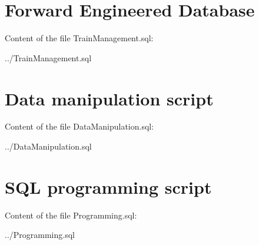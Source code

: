 \section{Forward Engineered Database}

Content of the file TrainManagement.sql:


{../TrainManagement.sql}


\section{Data manipulation script}

Content of the file DataManipulation.sql:


{../DataManipulation.sql}


\section{SQL programming script}

Content of the file Programming.sql:


{../Programming.sql}
